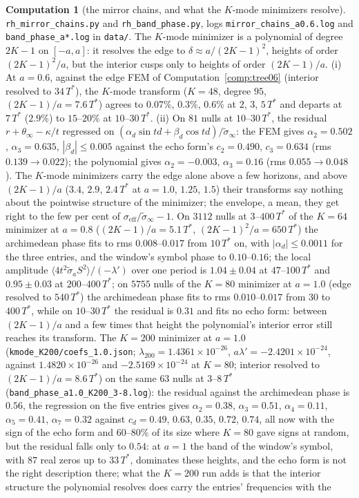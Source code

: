 \documentclass[11pt]{article}
\theoremstyle{definition}
\newtheorem{computation}[theorem]{Computation}
\theoremstyle{remark}
\newcommand{\Tst}{T^{*}}
\begin{document}
\begin{computation}[the mirror chains, and what the $K$-mode minimizers resolve]\label{comp:mirror}
\sloppy \texttt{rh\_mirror\_chains.py} and \texttt{rh\_band\_phase.py}, logs \texttt{mirror\_chains\_a0.6.log} and \texttt{band\_phase\_a*.log} in \texttt{data/}. The $K$-mode minimizer is a polynomial of degree $2K-1$ on $[-a,a]$: it resolves the edge to $\delta\approx a/(2K-1)^2$, heights of order $(2K-1)^2/a$, but the interior cusps only to heights of order $(2K-1)/a$. (i) At $a=0.6$, against the edge FEM of Computation~\ref{comp:tree06} (interior resolved to $34\,\Tst$), the $K$-mode transform ($K=48$, degree $95$, $(2K-1)/a=7.6\,\Tst$) agrees to $0.07\%$, $0.3\%$, $0.6\%$ at $2$, $3$, $5\,\Tst$ and departs at $7\,\Tst$ ($2.9\%$) to $15$--$20\%$ at $10$--$30\,\Tst$. (ii) On $81$ nulls at $10$--$30\,\Tst$, the residual $r+\theta_\infty-\kappa/t$ regressed on $(\alpha_d\sin td+\beta_d\cos td)/\tilde\sigma_\infty$: the FEM gives $\alpha_2=0.502$, $\alpha_3=0.635$, $|\beta_d|\le0.005$ against the echo form's $c_2=0.490$, $c_3=0.634$ (rms $0.139\to0.022$); the polynomial gives $\alpha_2=-0.003$, $\alpha_3=0.16$ (rms $0.055\to0.048$). The $K$-mode minimizers carry the edge alone above a few horizons, and above $(2K-1)/a$ ($3.4$, $2.9$, $2.4\,\Tst$ at $a=1.0$, $1.25$, $1.5$) their transforms say nothing about the pointwise structure of the minimizer; the envelope, a mean, they get right to the few per cent of $\sigma_{\mathrm{eff}}/\tilde\sigma_\infty-1$. On $3112$ nulls at $3$--$400\,\Tst$ of the $K=64$ minimizer at $a=0.8$ ($(2K-1)/a=5.1\,\Tst$, $(2K-1)^2/a=650\,\Tst$) the archimedean phase fits to rms $0.008$--$0.017$ from $10\,\Tst$ on, with $|\alpha_d|\le0.0011$ for the three entries, and the window's symbol phase to $0.10$--$0.16$; the local amplitude $\langle4t^2\tilde\sigma_a S^2\rangle/(-\lambda')$ over one period is $1.04\pm0.04$ at $47$--$100\,\Tst$ and $0.95\pm0.03$ at $200$--$400\,\Tst$; on $5755$ nulls of the $K=80$ minimizer at $a=1.0$ (edge resolved to $540\,\Tst$) the archimedean phase fits to rms $0.010$--$0.017$ from $30$ to $400\,\Tst$, while on $10$--$30\,\Tst$ the residual is $0.31$ and fits no echo form: between $(2K-1)/a$ and a few times that height the polynomial's interior error still reaches its transform. The $K=200$ minimizer at $a=1.0$ (\texttt{kmode\_K200/coefs\_1.0.json}; $\lambda_{200}=1.4361\times10^{-26}$, $a\lambda'=-2.4201\times10^{-24}$, against $1.4820\times10^{-26}$ and $-2.5169\times10^{-24}$ at $K=80$; interior resolved to $(2K-1)/a=8.6\,\Tst$) on the same $63$ nulls at $3$--$8\,\Tst$ (\texttt{band\_phase\_a1.0\_K200\_3-8.log}): the residual against the archimedean phase is $0.56$, the regression on the five entries gives $\alpha_2=0.38$, $\alpha_3=0.51$, $\alpha_4=0.11$, $\alpha_5=0.41$, $\alpha_7=0.32$ against $c_d=0.49$, $0.63$, $0.35$, $0.72$, $0.74$, all now with the sign of the echo form and $60$--$80\%$ of its size where $K=80$ gave signs at random, but the residual falls only to $0.54$: at $a=1$ the band of the window's symbol, with $87$ real zeros up to $33\,\Tst$, dominates these heights, and the echo form is not the right description there; what the $K=200$ run adds is that the interior structure the polynomial resolves does carry the entries' frequencies with the 
\end{computation}
\end{document}
